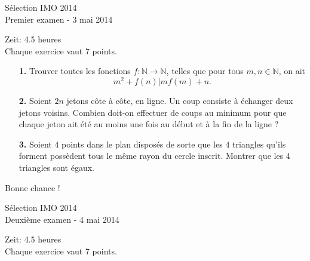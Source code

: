 \documentclass[12pt,a4paper]{article}
\theoremstyle{plain}
\theoremstyle{definition}
\begin{document}
\pagestyle{empty}

\begin{center}
{\huge Sélection IMO 2014} \\
\medskip Premier examen - 3 mai 2014
\end{center}
\vspace{8mm}
Zeit: 4.5 heures\\
Chaque exercice vaut 7 points.

\vspace{15mm}

\begin{enumerate}

\item[\textbf{1.}] Trouver toutes les fonctions $f: \mathbb{N} \to \mathbb{N}$, telles que pour tous $m,n\in \mathbb{N}$, on ait
\[m^2+f(n)|mf(m)+n.\]


\bigskip
\bigskip

\item[\textbf{2.}] Soient $2n$ jetons côte à côte, en ligne. Un coup consiste à échanger deux jetons voisins. Combien doit-on effectuer de coups au minimum pour que chaque jeton ait été au moins une fois au début et à la fin de la ligne ?

\bigskip
\bigskip

\item[\textbf{3.}] Soient $4$ points dans le plan disposés de sorte que les $4$ triangles qu'ils forment possèdent tous le même rayon du cercle inscrit. Montrer que les $4$ triangles sont égaux.

\end{enumerate}

\vspace{15mm}
\begin{center}
Bonne chance !
\end{center}

\pagebreak




\begin{center}
{\huge Sélection IMO 2014} \\
\medskip Deuxième examen - 4 mai 2014
\end{center}
\vspace{8mm}
Zeit: 4.5 heures\\
Chaque exercice vaut 7 points.

\vspace{15mm}
\end{document}
